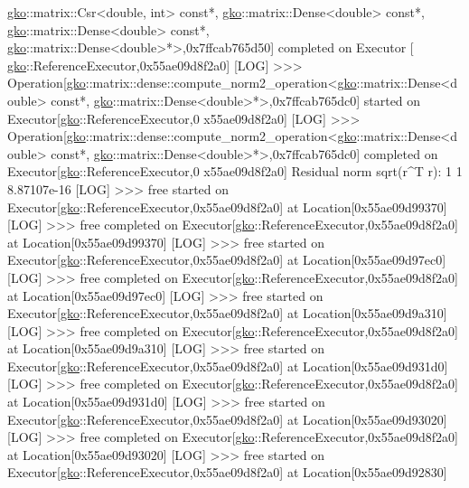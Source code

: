 \begin{DoxyCode}
      \hyperlink{namespacegko}{gko}::matrix::Csr<double, int> const*, \hyperlink{namespacegko}{gko}::matrix::Dense<double> const*, 
      \hyperlink{namespacegko}{gko}::matrix::Dense<double> const*, \hyperlink{namespacegko}{gko}::matrix::Dense<double>*>,0x7ffcab765d50] completed on Executor
      [
\hyperlink{namespacegko}{gko}::ReferenceExecutor,0x55ae09d8f2a0]
[LOG] >>> Operation[\hyperlink{namespacegko}{gko}::matrix::dense::compute\_norm2\_operation<\hyperlink{namespacegko}{gko}::matrix::Dense<double> const*, 
      \hyperlink{namespacegko}{gko}::matrix::Dense<double>*>,0x7ffcab765dc0] started on Executor[\hyperlink{namespacegko}{gko}::ReferenceExecutor,0
      x55ae09d8f2a0]
[LOG] >>> Operation[\hyperlink{namespacegko}{gko}::matrix::dense::compute\_norm2\_operation<\hyperlink{namespacegko}{gko}::matrix::Dense<double> const*, 
      \hyperlink{namespacegko}{gko}::matrix::Dense<double>*>,0x7ffcab765dc0] completed on Executor[\hyperlink{namespacegko}{gko}::ReferenceExecutor,0
      x55ae09d8f2a0]
Residual norm sqrt(r^T r):
1 1
8.87107e-16
[LOG] >>> free started on Executor[\hyperlink{namespacegko}{gko}::ReferenceExecutor,0x55ae09d8f2a0] at Location[0x55ae09d99370]
[LOG] >>> free completed on Executor[\hyperlink{namespacegko}{gko}::ReferenceExecutor,0x55ae09d8f2a0] at Location[0x55ae09d99370]
[LOG] >>> free started on Executor[\hyperlink{namespacegko}{gko}::ReferenceExecutor,0x55ae09d8f2a0] at Location[0x55ae09d97ec0]
[LOG] >>> free completed on Executor[\hyperlink{namespacegko}{gko}::ReferenceExecutor,0x55ae09d8f2a0] at Location[0x55ae09d97ec0]
[LOG] >>> free started on Executor[\hyperlink{namespacegko}{gko}::ReferenceExecutor,0x55ae09d8f2a0] at Location[0x55ae09d9a310]
[LOG] >>> free completed on Executor[\hyperlink{namespacegko}{gko}::ReferenceExecutor,0x55ae09d8f2a0] at Location[0x55ae09d9a310]
[LOG] >>> free started on Executor[\hyperlink{namespacegko}{gko}::ReferenceExecutor,0x55ae09d8f2a0] at Location[0x55ae09d931d0]
[LOG] >>> free completed on Executor[\hyperlink{namespacegko}{gko}::ReferenceExecutor,0x55ae09d8f2a0] at Location[0x55ae09d931d0]
[LOG] >>> free started on Executor[\hyperlink{namespacegko}{gko}::ReferenceExecutor,0x55ae09d8f2a0] at Location[0x55ae09d93020]
[LOG] >>> free completed on Executor[\hyperlink{namespacegko}{gko}::ReferenceExecutor,0x55ae09d8f2a0] at Location[0x55ae09d93020]
[LOG] >>> free started on Executor[\hyperlink{namespacegko}{gko}::ReferenceExecutor,0x55ae09d8f2a0] at Location[0x55ae09d92830]

\end{DoxyCode}
